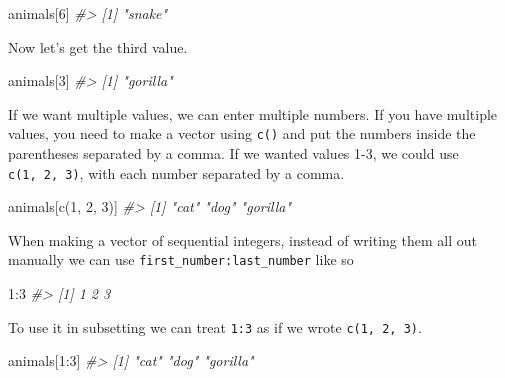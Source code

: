 \documentclass[
]{krantz}
\makeatletter
\newenvironment{Shaded}{\begin{snugshade}}{\end{snugshade}}
\newcommand{\CommentTok}[1]{\textcolor[rgb]{0.37,0.37,0.37}{\textit{#1}}}
\newcommand{\DecValTok}[1]{\textcolor[rgb]{0.06,0.06,0.06}{#1}}
\newcommand{\FunctionTok}[1]{\textcolor[rgb]{0,0,0}{#1}}
\newcommand{\NormalTok}[1]{#1}
\newcommand{\SpecialCharTok}[1]{\textcolor[rgb]{0,0,0}{#1}}
\newenvironment{kframe}{%
\medskip{}
\setlength{\fboxsep}{.8em}
 \def\at@end@of@kframe{}%
 \ifinner\ifhmode%
  \def\at@end@of@kframe{\end{minipage}}%
  \begin{minipage}{\columnwidth}%
 \fi\fi%
 \def\FrameCommand##1{\hskip\@totalleftmargin \hskip-\fboxsep
 \colorbox{shadecolor}{##1}\hskip-\fboxsep
     \hskip-\linewidth \hskip-\@totalleftmargin \hskip\columnwidth}%
 \MakeFramed {\advance\hsize-\width
   \@totalleftmargin\z@ \linewidth\hsize
   \@setminipage}}%
 {\par\unskip\endMakeFramed%
 \at@end@of@kframe}
\renewenvironment{Shaded}{\begin{kframe}}{\end{kframe}}
\makeatother
\begin{document}
\begin{Shaded}
\begin{Highlighting}[]
\NormalTok{animals[}\DecValTok{6}\NormalTok{]}
\CommentTok{\#\textgreater{} [1] "snake"}
\end{Highlighting}
\end{Shaded}

Now let's get the third value.

\begin{Shaded}
\begin{Highlighting}[]
\NormalTok{animals[}\DecValTok{3}\NormalTok{]}
\CommentTok{\#\textgreater{} [1] "gorilla"}
\end{Highlighting}
\end{Shaded}

If we want multiple values, we can enter multiple numbers.
If you have multiple values, you need to make a vector using
\texttt{c()} and put the numbers inside the parentheses
separated by a comma. If we wanted values 1-3, we could use
\texttt{c(1,\ 2,\ 3)}, with each number separated by a
comma.

\begin{Shaded}
\begin{Highlighting}[]
\NormalTok{animals[}\FunctionTok{c}\NormalTok{(}\DecValTok{1}\NormalTok{, }\DecValTok{2}\NormalTok{, }\DecValTok{3}\NormalTok{)]}
\CommentTok{\#\textgreater{} [1] "cat"     "dog"     "gorilla"}
\end{Highlighting}
\end{Shaded}

When making a vector of sequential integers, instead of
writing them all out manually we can use
\texttt{first\_number:last\_number} like so

\begin{Shaded}
\begin{Highlighting}[]
\DecValTok{1}\SpecialCharTok{:}\DecValTok{3}
\CommentTok{\#\textgreater{} [1] 1 2 3}
\end{Highlighting}
\end{Shaded}

To use it in subsetting we can treat \texttt{1:3} as if we
wrote \texttt{c(1,\ 2,\ 3)}.

\begin{Shaded}
\begin{Highlighting}[]
\NormalTok{animals[}\DecValTok{1}\SpecialCharTok{:}\DecValTok{3}\NormalTok{]}
\CommentTok{\#\textgreater{} [1] "cat"     "dog"     "gorilla"}
\end{Highlighting}
\end{Shaded}
\end{document}
